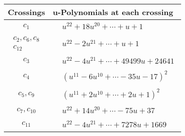 \documentclass[1p]{elsarticle_modified}
\theoremstyle{definition}
\begin{document}
\begin{tabular}{m{50pt}|m{274pt}}
Crossings & \hspace{64pt}u-Polynomials at each crossing \\
\hline $$\begin{aligned}c_{1}\end{aligned}$$&$\begin{aligned}
&u^{22}+18 u^{20}+\cdots+u+1
\end{aligned}$\\
\hline $$\begin{aligned}c_{2},c_{6},c_{8}\\c_{12}\end{aligned}$$&$\begin{aligned}
&u^{22}-2 u^{21}+\cdots+u+1
\end{aligned}$\\
\hline $$\begin{aligned}c_{3}\end{aligned}$$&$\begin{aligned}
&u^{22}-4 u^{21}+\cdots+49499 u+24641
\end{aligned}$\\
\hline $$\begin{aligned}c_{4}\end{aligned}$$&$\begin{aligned}
&(u^{11}-6 u^{10}+\cdots-35 u-17)^{2}
\end{aligned}$\\
\hline $$\begin{aligned}c_{5},c_{9}\end{aligned}$$&$\begin{aligned}
&(u^{11}+2 u^{10}+\cdots+2 u+1)^{2}
\end{aligned}$\\
\hline $$\begin{aligned}c_{7},c_{10}\end{aligned}$$&$\begin{aligned}
&u^{22}+14 u^{20}+\cdots-75 u+37
\end{aligned}$\\
\hline $$\begin{aligned}c_{11}\end{aligned}$$&$\begin{aligned}
&u^{22}-4 u^{21}+\cdots+7278 u+1669
\end{aligned}$\\
\hline
\end{tabular}\\~\\
\end{document}
